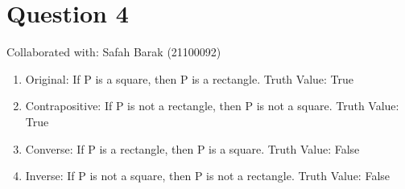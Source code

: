 \documentclass{article}
\begin{document}
\section{Question 4}
Collaborated with: Safah Barak (21100092)
\begin{enumerate}
\item %
Original: If P is a square, then P is a rectangle.						\hspace{30mm}	Truth Value: True
\item %
Contrapositive: If P is not a rectangle, then P is not a square.				\hspace{8mm}	Truth Value: True
\item %
Converse: If P is a rectangle, then P is a square.						\hspace{29mm}	Truth Value: False
\item %
Inverse: If P is not a square, then P is not a rectangle.					\hspace{20mm}	Truth Value: False

\end{enumerate}
\end{document}
